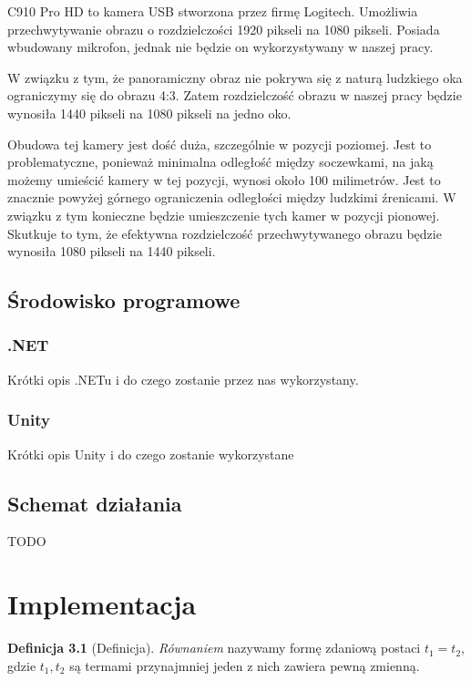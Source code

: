 \documentclass[a4paper,11pt,twoside]{report}
\theoremstyle{definition}
\newtheorem{definition}[theorem]{Definicja}
\begin{document}
C910 Pro HD to kamera USB stworzona przez firmę Logitech. Umożliwia przechwytywanie obrazu o rozdzielczości 1920 pikseli na 1080 pikseli. Posiada wbudowany mikrofon, jednak nie będzie on wykorzystywany w naszej pracy.

W związku z tym, że panoramiczny obraz nie pokrywa się z naturą ludzkiego oka ograniczymy się do obrazu 4:3. Zatem rozdzielczość obrazu w naszej pracy będzie wynosiła 1440 pikseli na 1080 pikseli na jedno oko.

Obudowa tej kamery jest dość duża, szczególnie w pozycji poziomej. Jest to problematyczne, ponieważ minimalna odległość między soczewkami, na jaką możemy umieścić kamery w tej pozycji, wynosi około 100 milimetrów. Jest to znacznie powyżej górnego ograniczenia odległości między ludzkimi źrenicami. W związku z tym konieczne będzie umieszczenie tych kamer w pozycji pionowej. Skutkuje to tym, że efektywna rozdzielczość przechwytywanego obrazu będzie wynosiła 1080 pikseli na 1440 pikseli.


\section{Środowisko programowe}

\subsection{.NET}

Krótki opis .NETu i do czego zostanie przez nas wykorzystany.

\subsection{Unity}

Krótki opis Unity i do czego zostanie wykorzystane


\section {Schemat działania}

TODO

\chapter {Implementacja}




\begin{definition}[Definicja]
\textit{Równaniem} nazywamy formę zdaniową postaci $t_1 = t_2$, gdzie $t_1, t_2$ są termami przynajmniej jeden z nich zawiera pewną zmienną.
\end{definition}
\end{document}
